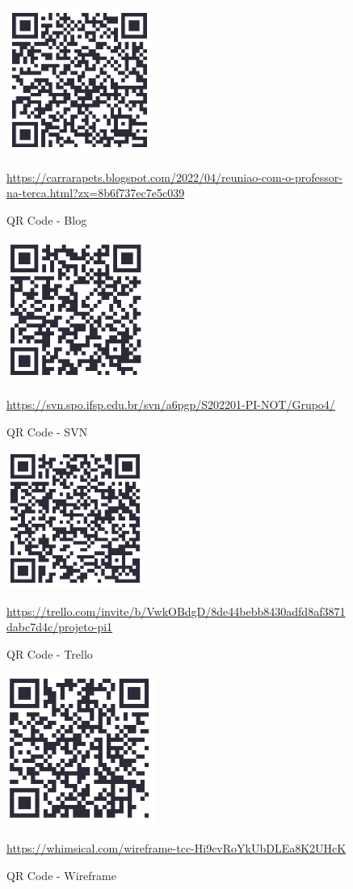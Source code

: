 \newpage
\begin{figure}
    \centering
    \includegraphics{exemplos/QRCode/QR blog.PNG}
    \caption{QR Code - Blog}
    \underline{https://carrarapets.blogspot.com/2022/04/reuniao-com-o-professor-na-terca.html?zx=8b6f737ec7e5c039}
    \label{QRBlog}
\end{figure}
    
\begin{figure}
    \centering
    \includegraphics{exemplos/QRCode/QR SVN.PNG}
    \caption{QR Code - SVN}
    \underline{https://svn.spo.ifsp.edu.br/svn/a6pgp/S202201-PI-NOT/Grupo4/}
    \label{QRSVN}
\end{figure}

\begin{figure}
    \centering
    \includegraphics{exemplos/QRCode/QR trello.PNG}
    \caption{QR Code - Trello}
    \underline{https://trello.com/invite/b/VwkOBdgD/8de44bebb8430adfd8af3871dabc7d4c/projeto-pi1}
    \label{QRTrello}
\end{figure}
    
\begin{figure}
    \centering
    \includegraphics{exemplos/QRCode/QR wireframe.PNG}
    \caption{QR Code - Wireframe}
    \underline{https://whimsical.com/wireframe-tcc-Hi9cvRoYkUbDLEa8K2UHcK}
    \label{QRWireframe}
\end{figure}

